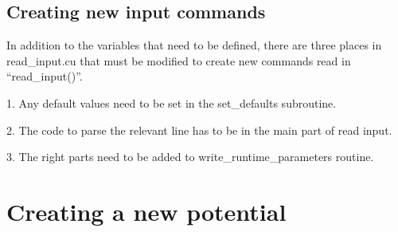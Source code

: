 \documentclass[12pt]{article}
\begin{document}
\subsection{Creating new input commands}

In addition to the variables that need to be defined, there are three places in read\_input.cu that must be modified to create new commands read in ``read\_input()''. 

1. Any default values need to be set in the set\_defaults subroutine.

2. The code to parse the relevant line has to be in the main part of read input.

3. The right parts need to be added to write\_runtime\_parameters routine.








\pagebreak
\section{Creating a new potential}
\end{document}
